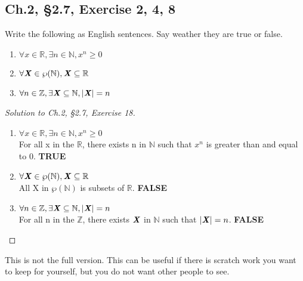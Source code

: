 \documentclass[12pt]{amsart}
\numberwithin{equation}{section}
\theoremstyle{definition}
\theoremstyle{remark}
\newif\ifnotes
\begin{document}


\subsection*{Ch.2, \S 2.7,  Exercise 2, 4, 8} Write the following as English sentences. Say weather they are true or false.

\begin{enumerate}

\item[2.]
$ \forall x \in \mathbb{R}, \exists n \in \mathbb{N}, x^n \geq 0 $

\item[4.]
$ \forall \textbf{\textit{X}} \in \wp (\mathbb{N}), \textbf{\textit{X}} \subseteq \mathbb{R} $

\item[8.]
$ \forall n \in \mathbb{Z}, \exists \textbf{\textit{X}} \subseteq \mathbb{N}, |\textbf{\textit{X}}| = n $

\end{enumerate}


\begin{proof}[Solution to Ch.2, \S 2.7,  Exercise 18] \ \\

\begin{enumerate}

\item[2.]
$ \forall x \in \mathbb{R}, \exists n \in \mathbb{N}, x^n \geq 0 $
\ \\
For all x in the $ \mathbb{R} $, there exists n in $ \mathbb{N} $ such that $ x^n $ is greater than and equal to 0. \textbf{TRUE}

\item[4.]
$ \forall \textbf{\textit{X}} \in \wp(\mathbb{N}), \textbf{\textit{X}} \subseteq \mathbb{R} $
\ \\
All X in $ \wp (\mathbb{N}) $ is subsets of $ \mathbb{R} $. \textbf{FALSE}

\item[8.]
$ \forall n \in \mathbb{Z}, \exists \textbf{\textit{X}} \subseteq \mathbb{N}, |\textbf{\textit{X}}| = n $
\ \\
For all n in the $ \mathbb{Z} $, there exists $ \textbf{\textit{X}} $ in $ \mathbb{N} $ such that $ |\textbf{\textit{X}}| = n$. \textbf{FALSE}

\end{enumerate}

\end{proof}

\newpage

\ifnotes


\else
	This is not the full version.  This can be useful if there is scratch work you want to keep for yourself, but you do not want other people to see. 
\fi





\end{document}
